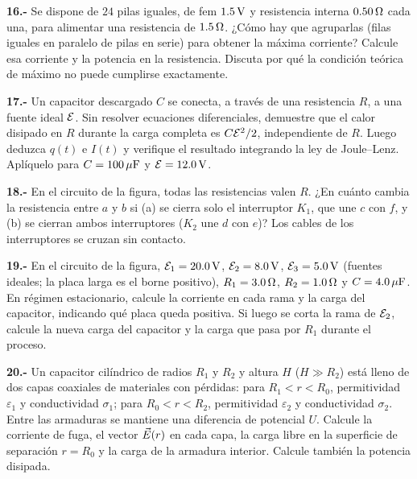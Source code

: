 \documentclass[11pt]{article}
\newcommand{\grupo}[1]{\par\medskip{\color{azul}\bfseries Grupo #1}\par\smallskip}
\newcommand{\p}[1]{\par\smallskip\textbf{#1.-} }
\begin{document}
\grupo{IV}
\p{16} Se dispone de $24$ pilas iguales, de fem $1.5\uu{V}$ y resistencia interna $0.50\ohm$ cada una, para alimentar una resistencia de $1.5\ohm$. ¿Cómo hay que agruparlas (filas iguales en paralelo de pilas en serie) para obtener la máxima corriente? Calcule esa corriente y la potencia en la resistencia. Discuta por qué la condición teórica de máximo no puede cumplirse exactamente.

\p{17} Un capacitor descargado $C$ se conecta, a través de una resistencia $R$, a una fuente ideal $\fem$. Sin resolver ecuaciones diferenciales, demuestre que el calor disipado en $R$ durante la carga completa es $C\fem^2/2$, independiente de $R$. Luego deduzca $q(t)$ e $I(t)$ y verifique el resultado integrando la ley de Joule--Lenz. Aplíquelo para $C=100\uu{\mu F}$ y $\fem=12.0\uu{V}$.

\p{18} En el circuito de la figura, todas las resistencias valen $R$. ¿En cuánto cambia la resistencia entre $a$ y $b$ si (a) se cierra solo el interruptor $K_1$, que une $c$ con $f$, y (b) se cierran ambos interruptores ($K_2$ une $d$ con $e$)? Los cables de los interruptores se cruzan sin contacto.
\begin{center}\circInterruptoresDos\end{center}

\p{19} En el circuito de la figura, $\fem_1=20.0\uu{V}$, $\fem_2=8.0\uu{V}$, $\fem_3=5.0\uu{V}$ (fuentes ideales; la placa larga es el borne positivo), $R_1=3.0\ohm$, $R_2=1.0\ohm$ y $C=4.0\uu{\mu F}$. En régimen estacionario, calcule la corriente en cada rama y la carga del capacitor, indicando qué placa queda positiva. Si luego se corta la rama de $\fem_2$, calcule la nueva carga del capacitor y la carga que pasa por $R_1$ durante el proceso.
\begin{center}\circSdosCap\end{center}

\p{20} Un capacitor cilíndrico de radios $R_1$ y $R_2$ y altura $H$ ($H\gg R_2$) está lleno de dos capas coaxiales de materiales con pérdidas: para $R_1<r<R_0$, permitividad $\varepsilon_1$ y conductividad $\sigma_1$; para $R_0<r<R_2$, permitividad $\varepsilon_2$ y conductividad $\sigma_2$. Entre las armaduras se mantiene una diferencia de potencial $U$. Calcule la corriente de fuga, el vector $\vE(r)$ en cada capa, la carga libre en la superficie de separación $r=R_0$ y la carga de la armadura interior. Calcule también la potencia disipada.
\end{document}
